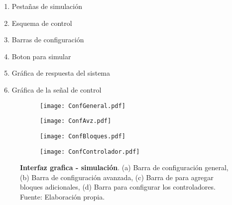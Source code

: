     \begin{multicols}{2}
        \begin{enumerate}[leftmargin=20pt]
            \item Pestañas de simulación
            \item Esquema de control
            \item Barras de configuración
            \item Boton para simular
            \item Gráfica de respuesta del sistema
            \item Gráfica de la señal de control
        \end{enumerate}
    \end{multicols}

    \begin{figure}[h]
        \centering
        \begin{subfigure}[b]{0.49\textwidth}
            \centering
            \texttt{[image: ConfGeneral.pdf]}
            \caption{}
            \label{fig:ConfGeneral}
        \end{subfigure}
        \hfill
        \begin{subfigure}[b]{0.49\textwidth}
            \centering
            \texttt{[image: ConfAvz.pdf]}
            \caption{}
            \label{fig:ConfAvz}
        \end{subfigure}
        \hfill
        \begin{subfigure}[b]{0.49\textwidth}
            \centering
            \texttt{[image: ConfBloques.pdf]}
            \caption{}
            \label{fig:ConfBloques}
        \end{subfigure}
        \hfill
        \begin{subfigure}[b]{0.49\textwidth}
            \centering
            \texttt{[image: ConfControlador.pdf]}
            \caption{}
            \label{fig:ConfControlador}
        \end{subfigure}
        \caption[Interfaz grafica - simulación - Barras de configuración]{\textbf{Interfaz grafica - simulación}. (a) Barra de configuración general, (b) Barra de configuración avanzada, (c) Barra de para agregar bloques adicionales, (d) Barra para configurar los controladores. Fuente: Elaboración propia. \label{fig:SimulacionBarras}}
    \end{figure}

